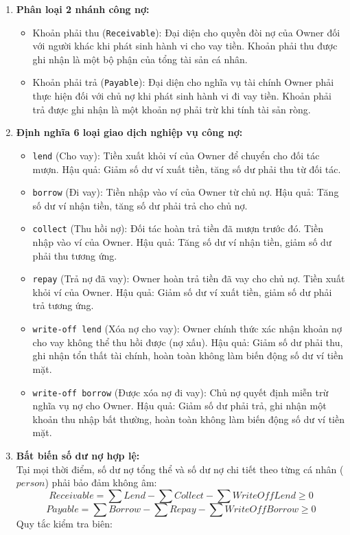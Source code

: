 \documentclass[11pt,a4paper]{article}
\providecommand{\tightlist}{
  \setlength{\itemsep}{0pt}\setlength{\parskip}{0pt}}
\begin{document}
\begin{enumerate}
\def\labelenumi{\arabic{enumi}.}
\item
  \textbf{Phân loại 2 nhánh công nợ:}

  \begin{itemize}
  \tightlist
  \item
    Khoản phải thu (\texttt{Receivable}): Đại diện cho quyền đòi nợ của
    Owner đối với người khác khi phát sinh hành vi cho vay tiền. Khoản
    phải thu được ghi nhận là một bộ phận của tổng tài sản cá nhân.
  \item
    Khoản phải trả (\texttt{Payable}): Đại diện cho nghĩa vụ tài chính
    Owner phải thực hiện đối với chủ nợ khi phát sinh hành vi đi vay
    tiền. Khoản phải trả được ghi nhận là một khoản nợ phải trừ khi tính
    tài sản ròng.
  \end{itemize}
\item
  \textbf{Định nghĩa 6 loại giao dịch nghiệp vụ công nợ:}

  \begin{itemize}
  \tightlist
  \item
    \texttt{lend} (Cho vay): Tiền xuất khỏi ví của Owner để chuyển cho
    đối tác mượn. Hậu quả: Giảm số dư ví xuất tiền, tăng số dư phải thu
    từ đối tác.
  \item
    \texttt{borrow} (Đi vay): Tiền nhập vào ví của Owner từ chủ nợ. Hậu
    quả: Tăng số dư ví nhận tiền, tăng số dư phải trả cho chủ nợ.
  \item
    \texttt{collect} (Thu hồi nợ): Đối tác hoàn trả tiền đã mượn trước
    đó. Tiền nhập vào ví của Owner. Hậu quả: Tăng số dư ví nhận tiền,
    giảm số dư phải thu tương ứng.
  \item
    \texttt{repay} (Trả nợ đã vay): Owner hoàn trả tiền đã vay cho chủ
    nợ. Tiền xuất khỏi ví của Owner. Hậu quả: Giảm số dư ví xuất tiền,
    giảm số dư phải trả tương ứng.
  \item
    \texttt{write-off\ lend} (Xóa nợ cho vay): Owner chính thức xác nhận
    khoản nợ cho vay không thể thu hồi được (nợ xấu). Hậu quả: Giảm số
    dư phải thu, ghi nhận tổn thất tài chính, hoàn toàn không làm biến
    động số dư ví tiền mặt.
  \item
    \texttt{write-off\ borrow} (Được xóa nợ đi vay): Chủ nợ quyết định
    miễn trừ nghĩa vụ nợ cho Owner. Hậu quả: Giảm số dư phải trả, ghi
    nhận một khoản thu nhập bất thường, hoàn toàn không làm biến động số
    dư ví tiền mặt.
  \end{itemize}
\item
  \textbf{Bất biến số dư nợ hợp lệ:}\\
  Tại mọi thời điểm, số dư nợ tổng thể và số dư nợ chi tiết theo từng cá
  nhân (\(person\)) phải bảo đảm không âm:
  \[Receivable = \sum Lend - \sum Collect - \sum WriteOffLend \ge 0\]
  \[Payable = \sum Borrow - \sum Repay - \sum WriteOffBorrow \ge 0\] Quy
  tắc kiểm tra biên:


\end{enumerate}
\end{document}
